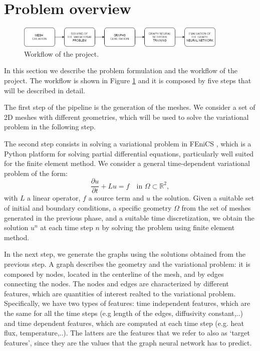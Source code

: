 \documentclass[11pt,a4paper]{article}
\begin{document}
\section{Problem overview}
\label{problem}

\begin{figure}[H]
    \centering
    \includegraphics[width=0.9\textwidth]{Images/schema.png}
    \caption{Workflow of the project.}
    \label{workflow}
\end{figure}

In this section we describe the problem formulation and the workflow of the project. The workflow is shown in Figure \ref{workflow} and it is composed by five steps that will be described in detail. 

The first step of the pipeline is the generation of the meshes. We consider a set of 2D meshes with different geometries, which will be used to solve the variational problem in the following step.

The second step consists in solving a variational problem in FEniCS \cite{FEniCS}, which is a Python platform for solving partial differential equations, particularly well suited for the finite element method.
We consider a general time-dependent variational problem of the form:
\[ \frac{\partial u}{\partial t} + Lu=f \quad \text{in } \Omega \subset \mathbb{R}^2, \]
with \(L\) a linear operator, \(f\) a source term and \(u\) the solution.
Given a suitable set of initial and boundary conditions, a specific geometry \(\Omega\) from the set of meshes generated in the previous phase, and a suitable time discretization, we obtain the solution \(u^{n}\) at each time step \(n\) by solving the problem using finite element method.  

In the next step, we generate the graphs using the solutions obtained from the previous step. A graph describes the geometry and the variational problem: it is composed by nodes, located in the centerline of the mesh, and by edges connecting the nodes. The nodes and edges are characterized by different features, which are quantities of interest realted to the variational problem. Specifically, we have two types of features: time independent features, which are the same for all the time steps (e.g length of the edges, diffusivity constant,..) and time dependent features, which are computed at each time step (e.g. heat flux, temperature,..). The latters are the features that we refer to also as `target features', since they are the values that the graph neural network has to predict.
\end{document}
